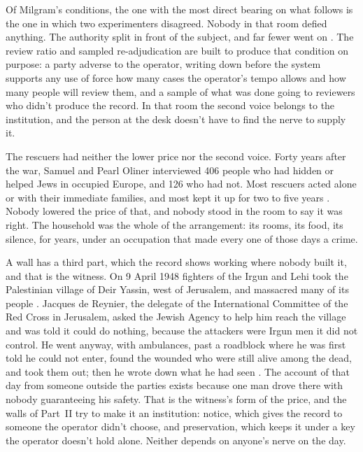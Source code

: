 Of Milgram's conditions, the one with the most direct bearing on what follows is the one in which two experimenters disagreed. Nobody in that room defied anything. The authority split in front of the subject, and far fewer went on \autocite{milgram1974obedience}. The review ratio and sampled re-adjudication are built to produce that condition on purpose: a party adverse to the operator, writing down before the system supports any use of force how many cases the operator's tempo allows and how many people will review them, and a sample of what was done going to reviewers who didn't produce the record. In that room the second voice belongs to the institution, and the person at the desk doesn't have to find the nerve to supply it.

The rescuers had neither the lower price nor the second voice. Forty years after the war, Samuel and Pearl Oliner interviewed 406 people who had hidden or helped Jews in occupied Europe, and 126 who had not. Most rescuers acted alone or with their immediate families, and most kept it up for two to five years \autocite{oliner1988altruistic}. Nobody lowered the price of that, and nobody stood in the room to say it was right. The household was the whole of the arrangement: its rooms, its food, its silence, for years, under an occupation that made every one of those days a crime.

A wall has a third part, which the record shows working where nobody built it, and that is the witness. On 9 April 1948 fighters of the Irgun and Lehi took the Palestinian village of Deir Yassin, west of Jerusalem, and massacred many of its people \autocite{morris2004birth}. Jacques de Reynier, the delegate of the International Committee of the Red Cross in Jerusalem, asked the Jewish Agency to help him reach the village and was told it could do nothing, because the attackers were Irgun men it did not control. He went anyway, with ambulances, past a roadblock where he was first told he could not enter, found the wounded who were still alive among the dead, and took them out; then he wrote down what he had seen \autocite{dereynier1950jerusalem}. The account of that day from someone outside the parties exists because one man drove there with nobody guaranteeing his safety. That is the witness's form of the price, and the walls of Part~II try to make it an institution: notice, which gives the record to someone the operator didn't choose, and preservation, which keeps it under a key the operator doesn't hold alone. Neither depends on anyone's nerve on the day.


